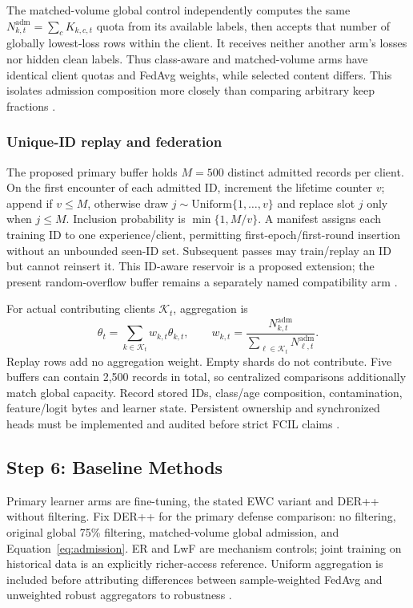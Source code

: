 \documentclass[10pt,a4paper]{article}
\begin{document}
The matched-volume global control independently computes the same $N_{k,t}^{\mathrm{adm}}=\sum_cK_{k,c,t}$ quota from its available labels, then accepts that number of globally lowest-loss rows within the client. It receives neither another arm's losses nor hidden clean labels. Thus class-aware and matched-volume arms have identical client quotas and FedAvg weights, while selected content differs. This isolates admission composition more closely than comparing arbitrary keep fractions \cite{repo}.

\subsubsection{Unique-ID replay and federation}
The proposed primary buffer holds $M=500$ distinct admitted records per client. On the first encounter of each admitted ID, increment the lifetime counter $v$; append if $v\le M$, otherwise draw $j\sim\mathrm{Uniform}\{1,\ldots,v\}$ and replace slot $j$ only when $j\le M$. Inclusion probability is $\min\{1,M/v\}$. A manifest assigns each training ID to one experience/client, permitting first-epoch/first-round insertion without an unbounded seen-ID set. Subsequent passes may train/replay an ID but cannot reinsert it. This ID-aware reservoir is a proposed extension; the present random-overflow buffer remains a separately named compatibility arm \cite{repo}.

For actual contributing clients $\mathcal K_t$, aggregation is
\begin{equation}
\theta_t=\sum_{k\in\mathcal K_t}w_{k,t}\theta_{k,t},\qquad
w_{k,t}=\frac{N_{k,t}^{\mathrm{adm}}}{\sum_{\ell\in\mathcal K_t}N_{\ell,t}^{\mathrm{adm}}}.
\end{equation}
Replay rows add no aggregation weight. Empty shards do not contribute. Five buffers can contain 2,500 records in total, so centralized comparisons additionally match global capacity. Record stored IDs, class/age composition, contamination, feature/logit bytes and learner state. Persistent ownership and synchronized heads must be implemented and audited before strict FCIL claims \cite{carillo,repo}.

\subsection{Step 6: Baseline Methods}
Primary learner arms are fine-tuning, the stated EWC variant and DER++ without filtering. Fix DER++ for the primary defense comparison: no filtering, original global 75\% filtering, matched-volume global admission, and Equation~\eqref{eq:admission}. ER and LwF are mechanism controls; joint training on historical data is an explicitly richer-access reference. Uniform aggregation is included before attributing differences between sample-weighted FedAvg and unweighted robust aggregators to robustness \cite{repo,carillo,cerasuolo}.
\end{document}
